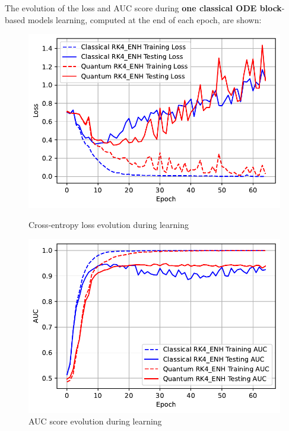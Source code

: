 \documentclass[12pt,a4paper]{report}
\begin{document}
\clearpage

The evolution of the loss and AUC score during \textbf{one classical ODE block}-based models learning, computed at the end of each epoch, are shown:

\begin{figure}[th]
  \centering
  \includegraphics[scale=0.88]{./pics/new_pdf_graphs/hybrid/hybrid_transfomer_loss_imdb_rk4_enh.pdf}
  \caption[Cross-entropy loss evolution during learning]{Cross-entropy loss evolution during learning}
  \label{fig:p37}
  \vspace*{\floatsep}
  \centering
  \includegraphics[scale=0.88]{./pics/new_pdf_graphs/hybrid/hybrid_auc_imdb_.pdf}
  \caption[AUC score evolution during learning]{AUC score evolution during learning}
  \label{fig:p38}
\end{figure}
\end{document}
